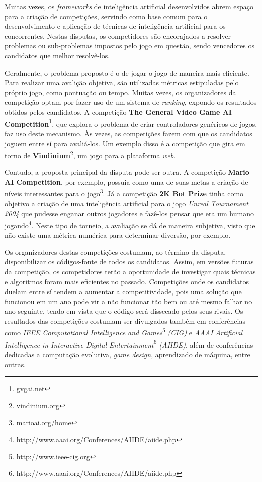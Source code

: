 Muitas vezes, os \textit{frameworks} de inteligência artificial desenvolvidos
abrem espaço para a criação de competições, servindo como base comum para o
desenvolvimento e aplicação de técnicas de inteligência artificial para os
concorrentes. Nestas disputas, os competidores são encorajados a resolver
problemas ou sub-problemas impostos pelo jogo em questão, sendo vencedores os
candidatos que melhor resolvê-los.

Geralmente, o problema proposto é o de jogar o jogo de maneira mais eficiente.
Para realizar uma avalição objetiva, são utilizadas métricas estipuladas pelo
próprio jogo, como pontuação ou tempo. Muitas vezes, os organizadores da
competição optam por fazer uso de um sistema de \textit{ranking}, expondo os
resultados obtidos pelos candidatos. A competição \textbf{The General Video
Game AI Competition}\footnote{gvgai.net}, que explora o problema de criar
controladores genéricos de jogos, faz uso deste mecanismo.  Às vezes, as
competições fazem com que os candidatos joguem entre sí para avaliá-los.  Um
exemplo disso é a competição que gira em torno de
\textbf{Vindinium}\footnote{vindinium.org}, um jogo para a plataforma
\textit{web}.

Contudo, a proposta principal da disputa pode ser outra. A competição
\textbf{Mario AI Competition}, por exemplo, possuia como uma de suas metas a
criação de níveis interessantes para o jogo\footnote{marioai.org/home}. Já a
competição \textbf{2K Bot Prize} tinha como objetivo a criação de uma
inteligência artificial para o jogo \textit{Unreal Tournament 2004} que pudesse
enganar outros jogadores e fazê-los pensar que era um humano
jogando\footnote{http://www.aaai.org/Conferences/AIIDE/aiide.php}. Neste tipo
de torneio, a avaliação se dá de maneira subjetiva, visto que não existe uma
métrica numérica para determinar diversão, por exemplo.

Os organizadores destas competições costumam, ao término da disputa,
disponibilizar os códigos-fonte de todos os candidatos. Assim, em versões
futuras da competição, os competidores terão a oportunidade de investigar quais
técnicas e algoritmos foram mais eficientes no passado. Competições onde os
candidatos duelam entre sí tendem a aumentar a competitividade, pois uma
solução que funcionou em um ano pode vir a não funcionar tão bem ou até mesmo
falhar no ano seguinte, tendo em vista que o código será dissecado pelos seus
rivais. Os resultados das competições costumam ser divulgados também em
conferências como \textit{IEEE Computational Intelligence and
Games}\footnote{http://www.ieee-cig.org} \textit{(CIG)} e \textit{AAAI
Artificial Intelligence in Interactive Digital
Entertainment}\footnote{http://www.aaai.org/Conferences/AIIDE/aiide.php}
\textit{(AIIDE)}, além de conferências dedicadas a computação evolutiva,
\textit{game design}, aprendizado de máquina, entre outras.



